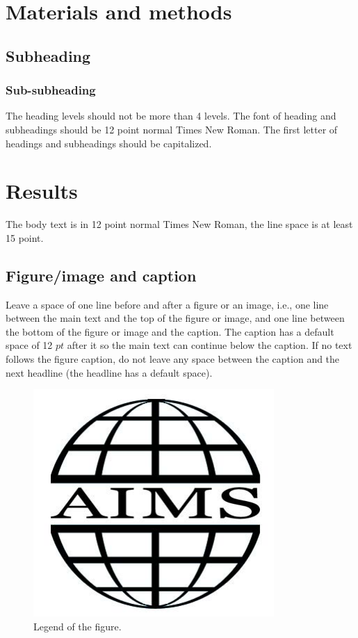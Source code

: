 \documentclass{aims}
\numberwithin{equation}{section}
\begin{document}
\section{Materials and methods}
\subsection{Subheading}

\subsubsection{Sub-subheading}
The heading levels should not be more than 4 levels. 
The font of heading and subheadings should be 12 point 
normal Times New Roman. The first letter of headings 
and subheadings should be capitalized.

\section{Results}
The body text is in 12 point normal Times New Roman, 
the line space is at least 15 point.
 


\subsection{Figure/image and caption}
 Leave a space of one line before and after a figure or an image, i.e., one line between the main text and the top of the figure or image, and one line between the bottom of the figure or image and the caption. The caption has a default space of 12 $pt$ after it so the main text can continue below the caption. If no text follows the figure caption, do not leave any space between the caption and the next headline (the headline has a default space). 
 
\begin{figure}[H]
\begin{center}
\includegraphics[scale=0.8]{figure.pdf}
\caption{Legend of the figure.}
\label{Fig1}
\end{center}
\end{figure}
\end{document}
